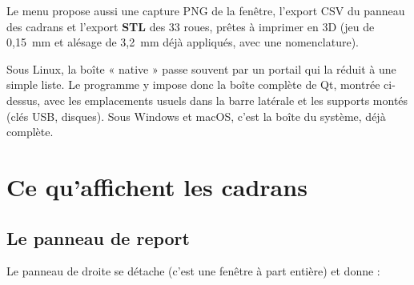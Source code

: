 Le menu  propose aussi une capture PNG de la fenêtre, l'export CSV du panneau
des cadrans et l'export \textbf{STL} des 33 roues, prêtes à imprimer en 3D (jeu de 0,15~mm et
alésage de 3,2~mm déjà appliqués, avec une nomenclature).


\begin{astuce}
Sous Linux, la boîte « native » passe souvent par un portail qui la réduit à une simple liste.
Le programme y impose donc la boîte complète de Qt, montrée ci-dessus, avec les emplacements
usuels dans la barre latérale et les supports montés (clés USB, disques). Sous Windows et
macOS, c'est la boîte du système, déjà complète.
\end{astuce}

\section{Ce qu'affichent les cadrans}

\subsection{Le panneau de report}

Le panneau de droite se détache (c'est une fenêtre à part entière) et donne :

